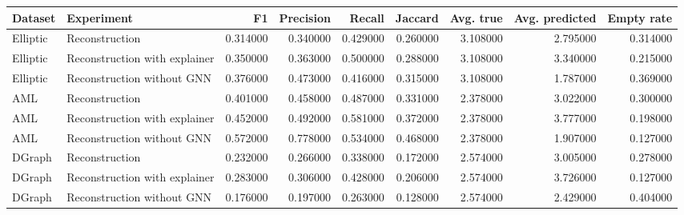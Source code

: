 \begin{tabular}{llrrrrrrr}
\toprule
Dataset & Experiment & F1 & Precision & Recall & Jaccard & Avg. true & Avg. predicted & Empty rate \\
\midrule
Elliptic & Reconstruction & 0.314000 & 0.340000 & 0.429000 & 0.260000 & 3.108000 & 2.795000 & 0.314000 \\
Elliptic & Reconstruction with explainer & 0.350000 & 0.363000 & 0.500000 & 0.288000 & 3.108000 & 3.340000 & 0.215000 \\
Elliptic & Reconstruction without GNN & 0.376000 & 0.473000 & 0.416000 & 0.315000 & 3.108000 & 1.787000 & 0.369000 \\
AML & Reconstruction & 0.401000 & 0.458000 & 0.487000 & 0.331000 & 2.378000 & 3.022000 & 0.300000 \\
AML & Reconstruction with explainer & 0.452000 & 0.492000 & 0.581000 & 0.372000 & 2.378000 & 3.777000 & 0.198000 \\
AML & Reconstruction without GNN & 0.572000 & 0.778000 & 0.534000 & 0.468000 & 2.378000 & 1.907000 & 0.127000 \\
DGraph & Reconstruction & 0.232000 & 0.266000 & 0.338000 & 0.172000 & 2.574000 & 3.005000 & 0.278000 \\
DGraph & Reconstruction with explainer & 0.283000 & 0.306000 & 0.428000 & 0.206000 & 2.574000 & 3.726000 & 0.127000 \\
DGraph & Reconstruction without GNN & 0.176000 & 0.197000 & 0.263000 & 0.128000 & 2.574000 & 2.429000 & 0.404000 \\
\bottomrule
\end{tabular}
